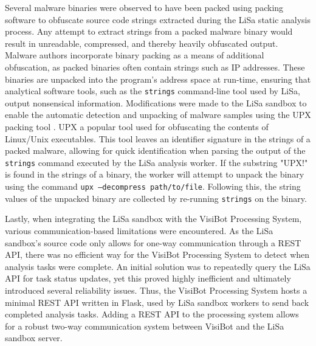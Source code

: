 Several malware binaries were observed to have been packed using packing software to obfuscate source code strings extracted during the LiSa static analysis process. Any attempt to extract strings from a packed malware binary would result in unreadable, compressed, and thereby heavily obfuscated output. Malware authors incorporate binary packing as a means of additional obfuscation, as packed binaries often contain strings such as IP addresses. These binaries are unpacked into the program's address space at run-time, \citep{Roundy2013} ensuring that analytical software tools, such as the \texttt{strings} command-line tool \citep{Strings} used by LiSa, output nonsensical information. Modifications were made to the LiSa sandbox to enable the automatic detection and unpacking of malware samples using the UPX packing tool \citep{UPX}. UPX a popular tool used for obfuscating the contents of Linux/Unix executables. This tool leaves an identifier signature in the strings of a packed malware, allowing for quick identification when parsing the output of the \texttt{strings} command executed by the LiSa analysis worker. If the substring "UPX!" is found in the strings of a binary, the worker will attempt to unpack the binary using the command \texttt{upx --decompress path/to/file}. Following this, the string values of the unpacked binary are collected by re-running \texttt{strings} on the binary.

Lastly, when integrating the LiSa sandbox with the VisiBot Processing System, various communication-based limitations were encountered. As the LiSa sandbox's source code only allows for one-way communication through a REST API, there was no efficient way for the VisiBot Processing System to detect when analysis tasks were complete. An initial solution was to repeatedly query the LiSa API for task status updates, yet this proved highly inefficient and ultimately introduced several reliability issues. Thus, the VisiBot Processing System hosts a minimal REST API written in Flask, \citep{Flask} used by LiSa sandbox workers to send back completed analysis tasks. Adding a REST API to the processing system allows for a robust two-way communication system between VisiBot and the LiSa sandbox server.

